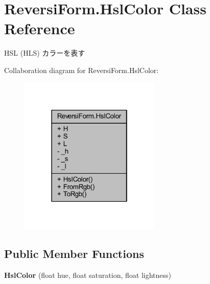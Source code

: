 \hypertarget{class_reversi_form_1_1_hsl_color}{}\section{Reversi\+Form.\+Hsl\+Color Class Reference}
\label{class_reversi_form_1_1_hsl_color}


H\+SL (H\+LS) カラーを表す  




Collaboration diagram for Reversi\+Form.\+Hsl\+Color\+:\nopagebreak
\begin{figure}[H]
\begin{center}
\leavevmode
\includegraphics[width=190pt]{class_reversi_form_1_1_hsl_color__coll__graph}
\end{center}
\end{figure}
\subsection*{Public Member Functions}
\begin{DoxyCompactItemize}
\item 
\mbox{\label{class_reversi_form_1_1_hsl_color_ada60003dff54b8b81df385bd37b23982}} 
{\bfseries Hsl\+Color} (float hue, float saturation, float lightness)
\end{DoxyCompactItemize}
